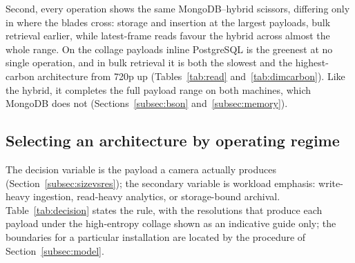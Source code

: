 \documentclass[pdflatex,sn-basic]{sn-jnl}%
\begin{document}
Second, every operation shows the same MongoDB--hybrid scissors, differing only in where the blades cross: storage and insertion at the largest payloads, bulk retrieval earlier, while latest-frame reads favour the hybrid across almost the whole range. On the collage payloads inline PostgreSQL is the greenest at no single operation, and in bulk retrieval it is both the slowest and the highest-carbon architecture from 720p up (Tables~\ref{tab:read} and~\ref{tab:dimcarbon}). Like the hybrid, it completes the full payload range on both machines, which MongoDB does not (Sections~\ref{subsec:bson} and~\ref{subsec:memory}).

\subsection{Selecting an architecture by operating regime}\label{subsec:selection}
The decision variable is the payload a camera actually produces (Section~\ref{subsec:sizevsres}); the secondary variable is workload emphasis: write-heavy ingestion, read-heavy analytics, or storage-bound archival. Table~\ref{tab:decision} states the rule, with the resolutions that produce each payload under the high-entropy collage shown as an indicative guide only; the boundaries for a particular installation are located by the procedure of Section~\ref{subsec:model}.
\end{document}

